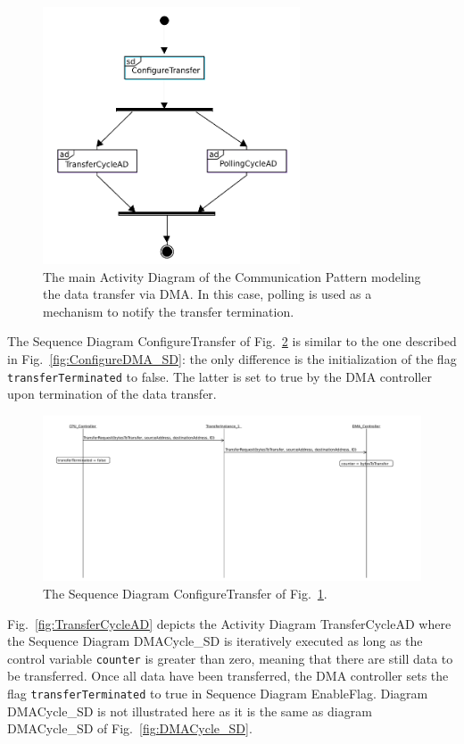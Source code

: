 \documentclass{llncs}
\begin{document}
\begin{figure}[!htbp]
	\centering
	\includegraphics[width=3in]{figures/mainCPDMAPolling.pdf}
	\caption{The main Activity Diagram of the Communication Pattern modeling the data transfer via DMA. In this case,
        polling is used as a mechanism to notify the transfer termination.}
	\label{fig:CPforPollingDMA}
\end{figure}

The Sequence Diagram ConfigureTransfer of Fig.~\ref{fig:ConfigureTransferPolling} is similar to the one described in
Fig.~\ref{fig:ConfigureDMA_SD}: the only difference is the initialization of the flag {\tt transferTerminated} to false. The
latter is set to true by the DMA controller upon termination of the data transfer.

\begin{figure}[!htbp]
	\centering
	\includegraphics[trim= 0cm 11cm 0cm 0cm,
	clip, width=\textwidth]{figures/ConfigureTransferPolling.pdf}
	\caption{The Sequence Diagram ConfigureTransfer of Fig.~\ref{fig:CPforPollingDMA}.}
	\label{fig:ConfigureTransferPolling}
\end{figure}

Fig.~\ref{fig:TransferCycleAD} depicts the Activity Diagram TransferCycleAD where the Sequence Diagram DMACycle\_SD
is iteratively executed as long as the control variable {\tt counter} is greater than zero, meaning that there are still
data to be transferred. Once all data have been transferred, the DMA controller sets the flag {\tt transferTerminated}
to true in Sequence Diagram EnableFlag. Diagram DMACycle\_SD is not illustrated here as it is the same as diagram
DMACycle\_SD of Fig.~\ref{fig:DMACycle_SD}.
\end{document}
